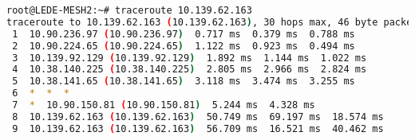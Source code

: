 \begin{lstlisting}[language=bash, caption={Mesh node traceroute to node AV-Ajuntament-Avinyonet.}]
root@LEDE-MESH2:~# traceroute 10.139.62.163
traceroute to 10.139.62.163 (10.139.62.163), 30 hops max, 46 byte packets
 1  10.90.236.97 (10.90.236.97)  0.717 ms  0.379 ms  0.788 ms
 2  10.90.224.65 (10.90.224.65)  1.122 ms  0.923 ms  0.494 ms
 3  10.139.92.129 (10.139.92.129)  1.892 ms  1.144 ms  1.022 ms
 4  10.38.140.225 (10.38.140.225)  2.805 ms  2.966 ms  2.824 ms
 5  10.38.141.65 (10.38.141.65)  3.118 ms  3.474 ms  3.255 ms
 6  *  *  *
 7  *  10.90.150.81 (10.90.150.81)  5.244 ms  4.328 ms
 8  10.139.62.163 (10.139.62.163)  50.749 ms  69.197 ms  18.574 ms
 9  10.139.62.163 (10.139.62.163)  56.709 ms  16.521 ms  40.462 ms
\end{lstlisting}